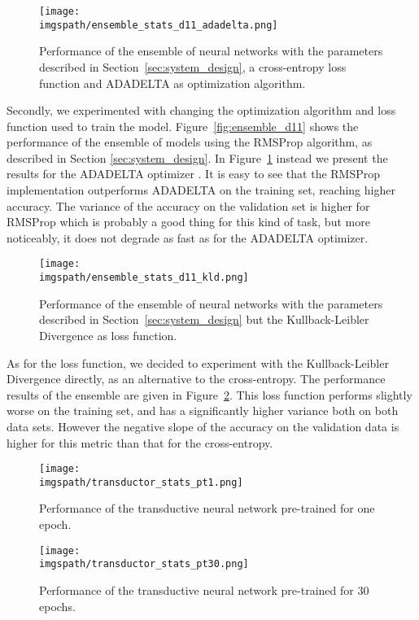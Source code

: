 \documentclass[conference]{IEEEtran}
\def\imgspath{./imgs}
\def\imgspath{../imgs}
\begin{document}
\begin{figure}[!ht]
	\centering
	\texttt{[image: \\imgspath/ensemble\_stats\_d11\_adadelta.png]}
	\caption{Performance of the ensemble of neural networks with the parameters
	described in Section~\ref{sec:system_design}, a cross-entropy loss function
	and ADADELTA as optimization algorithm.}
	\label{fig:ensemble_d11_adadelta}
\end{figure}

Secondly, we experimented with changing the optimization algorithm and loss
function used to train the model. Figure~\ref{fig:ensemble_d11} shows the
performance of the ensemble of models using the RMSProp algorithm, as described
in Section \ref{sec:system_design}. In Figure~\ref{fig:ensemble_d11_adadelta}
instead we present the results for the ADADELTA optimizer
\cite{zeiler2012adadelta}. It is easy to see that the RMSProp implementation
outperforms ADADELTA on the training set, reaching higher accuracy. The variance
of the accuracy on the validation set is higher for RMSProp which is probably a
good thing for this kind of task, but more noticeably, it does not degrade as
fast as for the ADADELTA optimizer.

\begin{figure}[!ht]
	\centering
	\texttt{[image: \\imgspath/ensemble\_stats\_d11\_kld.png]}
	\caption{Performance of the ensemble of neural networks with the parameters
	described in Section~\ref{sec:system_design} but the Kullback-Leibler
	Divergence as loss function.}
	\label{fig:ensemble_d11_kld}
\end{figure}

As for the loss function, we decided to experiment with the Kullback-Leibler
Divergence directly, as an alternative to the cross-entropy. The performance
results of the ensemble are given in Figure~\ref{fig:ensemble_d11_kld}. This
loss function performs slightly worse on the training set, and has a
significantly higher variance both on both data sets. However the negative slope
of the accuracy on the validation data is higher for this metric than that for
the cross-entropy.

\begin{figure}[!ht]
	\centering
	\texttt{[image: \\imgspath/transductor\_stats\_pt1.png]}
	\caption{Performance of the transductive neural network pre-trained for one epoch.}
	\label{fig:transductor_1}
\end{figure}

\begin{figure}[!ht]
	\centering
	\texttt{[image: \\imgspath/transductor\_stats\_pt30.png]}
	\caption{Performance of the transductive neural network pre-trained for 30 epochs.}
	\label{fig:transductor_30}
\end{figure}
\end{document}
